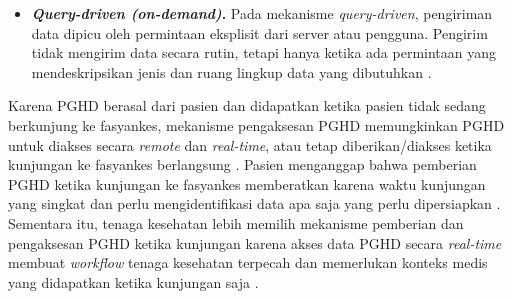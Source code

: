 \begin{itemize}
    \item \textbf{\textit{Query-driven (on-demand)}.}
    Pada mekanisme \textit{query-driven}, pengiriman data dipicu oleh permintaan eksplisit dari server atau pengguna.
    Pengirim tidak mengirim data secara rutin, tetapi hanya ketika ada permintaan yang mendeskripsikan jenis dan ruang lingkup data yang dibutuhkan \parencite{Akyildiz_Vuran_2010_WSN_Algorithms}.
\end{itemize}

Karena PGHD berasal dari pasien dan didapatkan ketika pasien tidak sedang berkunjung ke fasyankes, mekanisme pengaksesan PGHD memungkinkan PGHD untuk diakses secara \textit{remote} dan \textit{real-time}, atau tetap diberikan/diakses ketika kunjungan ke fasyankes berlangsung \parencite{Khatiwada_Yang_Lin_Blobel_2024_PGHD_Understanding}.
Pasien menganggap bahwa pemberian PGHD ketika kunjungan ke fasyankes memberatkan karena waktu kunjungan yang singkat dan perlu mengidentifikasi data apa saja yang perlu dipersiapkan \parencite{Khatiwada_Yang_Lin_Blobel_2024_PGHD_Understanding}.
Sementara itu, tenaga kesehatan lebih memilih mekanisme pemberian dan pengaksesan PGHD ketika kunjungan karena akses data PGHD secara \textit{real-time} membuat \textit{workflow} tenaga kesehatan terpecah dan memerlukan konteks medis yang didapatkan ketika kunjungan saja \parencite{Khatiwada_Yang_Lin_Blobel_2024_PGHD_Understanding,Bruckner2025_Healthcare_PGHD_Attitudes}.
